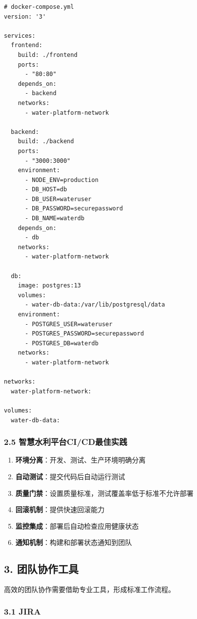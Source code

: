 \begin{lstlisting}
# docker-compose.yml
version: '3'

services:
  frontend:
    build: ./frontend
    ports:
      - "80:80"
    depends_on:
      - backend
    networks:
      - water-platform-network
  
  backend:
    build: ./backend
    ports:
      - "3000:3000"
    environment:
      - NODE_ENV=production
      - DB_HOST=db
      - DB_USER=wateruser
      - DB_PASSWORD=securepassword
      - DB_NAME=waterdb
    depends_on:
      - db
    networks:
      - water-platform-network
  
  db:
    image: postgres:13
    volumes:
      - water-db-data:/var/lib/postgresql/data
    environment:
      - POSTGRES_USER=wateruser
      - POSTGRES_PASSWORD=securepassword
      - POSTGRES_DB=waterdb
    networks:
      - water-platform-network

networks:
  water-platform-network:

volumes:
  water-db-data:
\end{lstlisting}

\subsubsection{2.5
智慧水利平台CI/CD最佳实践}\label{ux667aux6167ux6c34ux5229ux5e73ux53f0cicdux6700ux4f73ux5b9eux8df5}

\begin{enumerate}
\def\labelenumi{\arabic{enumi}.}
\tightlist
\item
  \textbf{环境分离}：开发、测试、生产环境明确分离
\item
  \textbf{自动测试}：提交代码后自动运行测试
\item
  \textbf{质量门禁}：设置质量标准，测试覆盖率低于标准不允许部署
\item
  \textbf{回滚机制}：提供快速回滚能力
\item
  \textbf{监控集成}：部署后自动检查应用健康状态
\item
  \textbf{通知机制}：构建和部署状态通知到团队
\end{enumerate}

\subsection{3. 团队协作工具}\label{ux56e2ux961fux534fux4f5cux5de5ux5177}

高效的团队协作需要借助专业工具，形成标准工作流程。

\subsubsection{3.1 JIRA}\label{jira}

